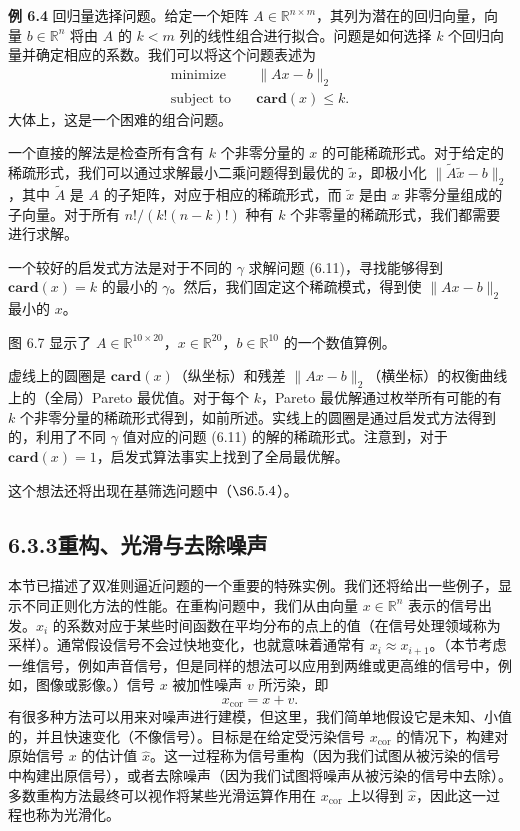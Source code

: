 \documentclass[UTF8,12pt,a4paper,fontset=fandol]{ctexart}
\begin{document}
\noindent\textbf{例 6.4}\quad
回归量选择问题。给定一个矩阵 $A\in\mathbb{R}^{n\times m}$，其列为潜在的回归向量，向量 $b\in\mathbb{R}^n$ 将由 $A$ 的 $k<m$ 列的线性组合进行拟合。问题是如何选择 $k$ 个回归向量并确定相应的系数。我们可以将这个问题表述为
\[
\begin{aligned}
\text{minimize}\quad & \|Ax-b\|_2\\
\text{subject to}\quad & \mathbf{card}(x)\leq k.
\end{aligned}
\]
大体上，这是一个困难的组合问题。

一个直接的解法是检查所有含有 $k$ 个非零分量的 $x$ 的可能稀疏形式。对于给定的稀疏形式，我们可以通过求解最小二乘问题得到最优的 $\tilde{x}$，即极小化 $\|\tilde{A}\tilde{x}-b\|_2$，其中 $\tilde{A}$ 是 $A$ 的子矩阵，对应于相应的稀疏形式，而 $\tilde{x}$ 是由 $x$ 非零分量组成的子向量。对于所有 $n!/(k!(n-k)!)$ 种有 $k$ 个非零量的稀疏形式，我们都需要进行求解。

一个较好的启发式方法是对于不同的 $\gamma$ 求解问题 (6.11)，寻找能够得到 $\mathbf{card}(x)=k$ 的最小的 $\gamma$。然后，我们固定这个稀疏模式，得到使 $\|Ax-b\|_2$ 最小的 $x$。

图 6.7 显示了 $A\in\mathbb{R}^{10\times 20}$，$x\in\mathbb{R}^{20}$，$b\in\mathbb{R}^{10}$ 的一个数值算例。

虚线上的圆圈是 $\mathbf{card}(x)$（纵坐标）和残差 $\|Ax-b\|_2$（横坐标）的权衡曲线上的（全局）Pareto 最优值。对于每个 $k$，Pareto 最优解通过枚举所有可能的有 $k$ 个非零分量的稀疏形式得到，如前所述。实线上的圆圈是通过启发式方法得到的，利用了不同 $\gamma$ 值对应的问题 (6.11) 的解的稀疏形式。注意到，对于 $\mathbf{card}(x)=1$，启发式算法事实上找到了全局最优解。

这个想法还将出现在基筛选问题中（$\S 6.5.4$）。

\subsection*{6.3.3\quad 重构、光滑与去除噪声}

本节已描述了双准则逼近问题的一个重要的特殊实例。我们还将给出一些例子，显示不同正则化方法的性能。在重构问题中，我们从由向量 $x\in\mathbb{R}^n$ 表示的信号出发。$x_i$ 的系数对应于某些时间函数在平均分布的点上的值（在信号处理领域称为采样）。通常假设信号不会过快地变化，也就意味着通常有 $x_i\approx x_{i+1}$。（本节考虑一维信号，例如声音信号，但是同样的想法可以应用到两维或更高维的信号中，例如，图像或影像。）信号 $x$ 被加性噪声 $v$ 所污染，即
\[
x_{\mathrm{cor}}=x+v.
\]
有很多种方法可以用来对噪声进行建模，但这里，我们简单地假设它是未知、小值的，并且快速变化（不像信号）。目标是在给定受污染信号 $x_{\mathrm{cor}}$ 的情况下，构建对原始信号 $x$ 的估计值 $\hat{x}$。这一过程称为信号重构（因为我们试图从被污染的信号中构建出原信号），或者去除噪声（因为我们试图将噪声从被污染的信号中去除）。多数重构方法最终可以视作将某些光滑运算作用在 $x_{\mathrm{cor}}$ 上以得到 $\hat{x}$，因此这一过程也称为光滑化。
\end{document}

